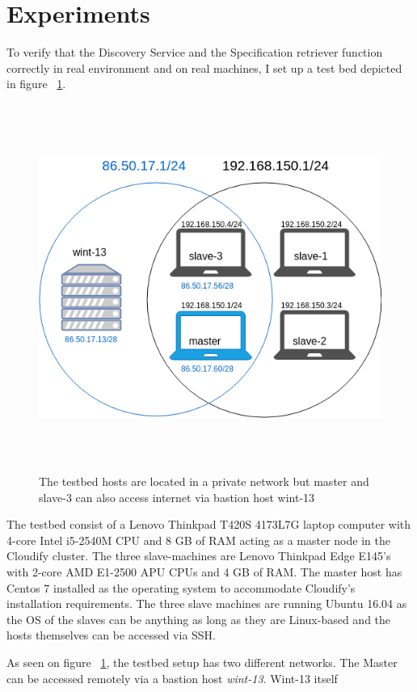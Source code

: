 \section{Experiments}

To verify that the Discovery Service and the Specification retriever function correctly in real environment and on real machines, I set up a test bed depicted in figure ~\ref{fig:network-venn}.

 \begin{figure}[ht!]
\centering
  \includegraphics[width=12cm,height=12cm, keepaspectratio]{Network-venn.png}%
  \caption{The testbed hosts are located in a private network but master and slave-3 can also access internet via bastion host wint-13}
  \label{fig:network-venn}
\end{figure}

The testbed consist of a Lenovo Thinkpad T420S 4173L7G laptop computer with  4-core Intel i5-2540M CPU and 8 GB of RAM acting as a master node in the Cloudify cluster. The three slave-machines are Lenovo Thinkpad Edge E145's with 2-core AMD E1-2500 APU CPUs and 4 GB of RAM. The master host has Centos 7 installed as the operating system to accommodate Cloudify's installation requirements. The three slave machines are running Ubuntu 16.04 as the OS of the slaves can be anything as long as they are Linux-based and the hosts themselves can be accessed via SSH.

As seen on figure ~\ref{fig:network-venn}, the testbed setup has two different networks. The Master can be accessed remotely via a bastion host \textit{wint-13}. Wint-13 itself
